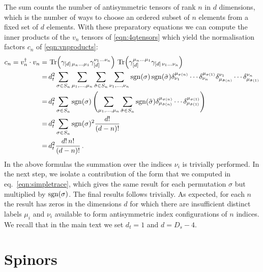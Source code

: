 The sum counts the number of antisymmetric tensors of
rank $n$ in $d$ dimensions, which is the number of ways to 
choose an ordered subset of $n$ elements from a fixed set of $d$
elements.
%
With these preparatory equations we can
compute the inner products of the $v_n$ tensors of 
\cref{eqn:4qtensors}
which yield the normalisation factors $c_n$
of \cref{eqn:vnproducts}:
\begin{align}
  \begin{split}
    \label{eq:cnCalc}
    c_n=v_n^\dagger\cdot v_n =&\,
%
    \Tr(\gamma_{[d]\,\mu_n \ldots \mu_1} \gamma_{[d]}^
    {\nu_1 \ldots \nu_n}) \,
%
    \Tr(\gamma_{[d]}^{\mu_n \ldots \mu_1} \gamma_{
    [d]\,\nu_1 \ldots \nu_n}) \\
    =&\,
    d_t^2 \sum_{\sigma\in  S_n} 
    \sum_{\mu_1,\ldots,\mu_n}
    \sum_{\tilde \sigma\in S_n}
    \sum_{\nu_1,\ldots,\nu_n}
%
    \sgn(\sigma)
    \sgn(\tilde\sigma)
    \delta^{\mu_{\sigma(n)}}_{\nu_1}\cdots\delta^{\mu_{\sigma(1)}}_{\nu_n}
    \delta_{\mu_{\tilde\sigma(n)}}^{\nu_1}\cdots
    \delta_{\mu_{\tilde\sigma(1)}}^{\nu_n}
    \\
%
    =&\,d_t^2 \sum_{\sigma\in  S_n} 
    \sgn(\sigma)
    \left(
    \sum_{\mu_1,\ldots,\mu_n}\sum_{\tilde \sigma\in S_n}
%
    \sgn(\tilde\sigma)
    \delta^{\mu_{\sigma(n)}}_{\mu_{\tilde\sigma(n)}}
    \cdots
    \delta^{\mu_{\sigma(1)}}_{\mu_{\tilde\sigma(1)}}
    \right)
    \\
%
    =&\, d_t^2 \sum_{\sigma\in  S_n} 
    \sgn(\sigma)^2 \frac{d!}{(d-n)!}\\
    =&\, d_t^2 \frac{d!\,n!}{(d-n)!}\,.
  \end{split}
\end{align}
In the above formulas the summation over the indices $\nu_i$ is 
trivially performed. In the next step, we isolate a contribution
of the form that we computed in eq.~\eqref{eqn:simpletrace},
which gives the same result for each permutation $\sigma$ but
multiplied by $\operatorname{sgn}(\sigma)$. The final results follows
trivially.
As expected, for each $n$ the result has zeros in the dimensions
$d$ for which there are insufficient distinct labels 
$\mu_i$ and $\nu_i$ available to form antisymmetric index 
configurations of $n$ indices.
We recall that in the main text we set $d_t=1$ and $d=D_s-4$.


\section{Spinors}




